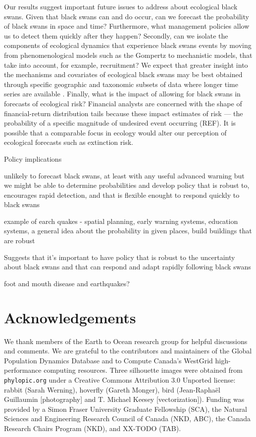 Our results suggest important future issues to address about ecological black
swans. Given that black swans can and do occur, can we forecast the probability
of black swans in space and time? Furthermore, what management policies allow
us to detect them quickly after they happen? Secondly, can we isolate the
components of ecological dynamics that experience black swans events by moving
from phenomenological models such as the Gompertz to mechanistic models, that
take into account, for example, recruitment? We expect that greater insight
into the mechanisms and covariates of ecological black swans may be best
obtained through specific geographic and taxonomic subsets of data where longer
time series are available \citep[e.g.][]{segura2013}. Finally, what is the
impact of allowing for black swans in forecasts of ecological risk? Financial
analysts are concerned with the shape of financial-return distribution tails
because these impact estimates of risk --- the probability of a specific
magnitude of undesired event occurring (REF). It is possible that a comparable
focus in ecology would alter our perception of ecological forecasts such as
extinction risk.

Policy implications

unlikely to forecast black swans, at least with any useful advanced warning
but we might be able to determine probabilities
and develop policy that is robust to, encourages rapid detection, and that is flexible enought to respond quickly to black swans

example of earch quakes - spatial planning, early warning systems, education systems, a general idea about the probability in given places, build buildings that are robust

Suggests that it's important to have policy that is robust to the uncertainty
about black swans and that can respond and adapt rapidly following black swans

foot and mouth disease and earthquakes?

\section{Acknowledgements}

We thank members of the Earth to Ocean research group for helpful discussions
and comments. We are grateful to the contributors and maintainers of the Global
Population Dynamics Database and to Compute Canada's WestGrid high-performance
computing resources. Three silhouette images were obtained from
\texttt{phylopic.org} under a Creative Commons Attribution 3.0 Unported
license: rabbit (Sarah Werning), hoverfly (Gareth Monger), bird (Jean-Raphaël
Guillaumin {[}photography{]} and T. Michael Keesey {[}vectorization{]}).
Funding was provided by a Simon Fraser University Graduate Fellowship (SCA),
the Natural Sciences and Engineering Research Council of Canada (NKD, ABC), the
Canada Research Chairs Program (NKD), and XX-TODO (TAB).

